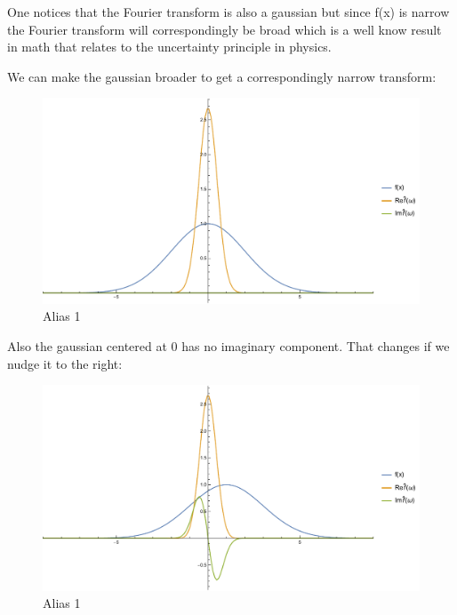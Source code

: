\documentclass[titlepage]{article}
\begin{document}
One notices that the Fourier transform is also a gaussian but since f(x) is narrow the Fourier transform will correspondingly be broad which is a well know result in math that relates to the uncertainty principle in physics.

We can make the gaussian broader to get a correspondingly narrow transform:

\begin{figure}[ht]
\centering
\includegraphics[scale=0.8,center]{images/gaussian2.pdf}
\caption{Alias 1}
\label{fig:2d}
\end{figure}
\FloatBarrier

Also the gaussian centered at 0 has no imaginary component. That changes if we nudge it to the right:

\begin{figure}[ht]
\centering
\includegraphics[scale=0.8,center]{images/gaussian3.pdf}
\caption{Alias 1}
\label{fig:2d}
\end{figure}
\FloatBarrier
\end{document}
